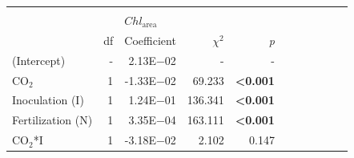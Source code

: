 \begin{landscape}
\begin{table}
{\begin{tabular}{p{3cm}p{0.5cm}p{1.75cm}p{1.5cm}p{1.5cm}p{1.75cm}p{1.5cm}p{1.5cm}p{1.75cm}p{1.5cm}p{1.5cm}}
            &&&&&&&&&&
            \\

            && \multicolumn{3}{l}{$Chl_\mathrm{area}$} &&&&& \\
            \hline
            & \multicolumn{1}{r}{df}
            & \multicolumn{1}{r}{Coefficient} & \multicolumn{1}{r}{$\chi^2$} & \multicolumn{1}{r}{\textit{p}} 
            \\
            \hline

            (Intercept) & \multicolumn{1}{r}{-}
            & \multicolumn{1}{r}{2.13E$-$02}  & \multicolumn{1}{r}{-}         & \multicolumn{1}{r}{-}
            & \multicolumn{1}{r}{}          & \multicolumn{1}{r}{}          & \multicolumn{1}{r}{}
            & \multicolumn{1}{r}{}          & \multicolumn{1}{r}{}          & \multicolumn{1}{r}{}
            \\

            CO$_2$ & \multicolumn{1}{r}{1}
            & \multicolumn{1}{r}{-1.33E$-$02} & \multicolumn{1}{r}{ 69.233}   & \multicolumn{1}{r}{\textbf{<0.001}}
            & \multicolumn{1}{r}{}          & \multicolumn{1}{r}{}          & \multicolumn{1}{r}{}
            & \multicolumn{1}{r}{}          & \multicolumn{1}{r}{}          & \multicolumn{1}{r}{} 
            \\


            Inoculation (I) & \multicolumn{1}{r}{1}
            & \multicolumn{1}{r}{1.24E$-$01}  & \multicolumn{1}{r}{136.341}   & \multicolumn{1}{r}{\textbf{<0.001}}
            & \multicolumn{1}{r}{}          & \multicolumn{1}{r}{}          & \multicolumn{1}{r}{}
            & \multicolumn{1}{r}{}          & \multicolumn{1}{r}{}          & \multicolumn{1}{r}{} 
            \\

            Fertilization (N) & \multicolumn{1}{r}{1}
            & \multicolumn{1}{r}{3.35E$-$04}  & \multicolumn{1}{r}{163.111}   & \multicolumn{1}{r}{\textbf{<0.001}}
            & \multicolumn{1}{r}{}          & \multicolumn{1}{r}{}          & \multicolumn{1}{r}{}
            & \multicolumn{1}{r}{}          & \multicolumn{1}{r}{}          & \multicolumn{1}{r}{} 
            \\

            CO$_2$*I & \multicolumn{1}{r}{1}
            & \multicolumn{1}{r}{-3.18E$-$02} & \multicolumn{1}{r}{  2.102}   & \multicolumn{1}{r}{0.147}
            & \multicolumn{1}{r}{}          & \multicolumn{1}{r}{}          & \multicolumn{1}{r}{}
            & \multicolumn{1}{r}{}          & \multicolumn{1}{r}{}          & \multicolumn{1}{r}{} 
            \\


\end{tabular}}
\end{table}
\end{landscape}
